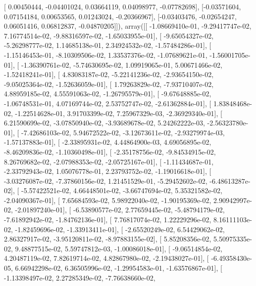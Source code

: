 \documentclass{article}
\begin{document}
       [ 0.00450444, -0.04401024,  0.03664119,  0.04098977, -0.07782698],
       [-0.03571604,  0.07154184,  0.00653565,  0.01243024, -0.20366967],
       [-0.03403476, -0.02654247,  0.06051416,  0.06812837, -0.04870205]]), array([[ -1.08669410e-01,  -9.29417747e-02,   7.16774514e-02,
         -9.88316597e-02,  -1.65033955e-01],
       [ -9.65054327e-02,  -5.26298777e-02,   1.14685138e-01,
          2.34924532e-02,  -1.57484286e-01],
       [ -1.15146453e-01,  -8.10309506e-02,   1.33537376e-02,
         -1.07689621e-01,  -1.56001705e-01],
       [ -1.36390761e-02,  -5.74630695e-02,   1.09919065e-01,
          5.00671466e-02,  -1.52418241e-01],
       [  4.83083187e-02,  -5.22141236e-02,  -2.93654150e-02,
         -9.05025364e-02,  -1.52636059e-01],
       [  1.79263829e-02,  -7.93710407e-02,   4.88959185e-02,
          4.55591063e-02,  -1.26795579e-01],
       [ -9.67648885e-02,  -1.06748531e-01,   4.07169744e-02,
          2.53752747e-02,  -2.61362884e-01],
       [  1.83848468e-02,  -1.22514628e-01,   3.91703399e-02,
          7.25967329e-03,  -2.36929340e-01],
       [  6.21590699e-02,  -3.07850940e-02,  -3.93689678e-02,
          5.24262222e-03,  -2.56323780e-01],
       [ -7.42686103e-02,   5.94672522e-02,  -3.12673611e-02,
         -2.93279974e-03,  -1.57137883e-01],
       [ -2.33895931e-02,   4.44864900e-03,   4.69056895e-02,
         -8.46209836e-02,  -1.10360498e-01],
       [ -2.35178756e-02,  -9.84534915e-02,   8.26769682e-02,
         -2.07988353e-02,  -2.05725167e-01],
       [ -1.11434687e-01,  -2.33792943e-02,   1.05076778e-01,
          2.23793752e-02,  -1.19016618e-01],
       [ -3.03276087e-02,  -7.37860156e-02,   1.21451529e-01,
         -5.29452602e-02,  -6.48613287e-02],
       [ -5.57422521e-02,   4.66448501e-02,  -3.66747694e-02,
          5.35321582e-02,  -2.04090367e-01],
       [  7.65684593e-02,   5.98922040e-02,  -1.90195369e-02,
          2.90942997e-02,  -2.01897240e-01],
       [ -6.53890577e-02,   2.77659445e-02,  -5.48794179e-02,
         -7.61892942e-02,  -1.84762136e-01],
       [  7.76817074e-02,   1.22229296e-02,   8.16111103e-02,
         -1.82459696e-02,  -1.33913411e-01],
       [ -2.65520249e-02,   6.54429062e-02,   2.86327917e-02,
         -3.95120811e-02,  -8.97883155e-02],
       [  5.85208356e-02,   5.50975335e-02,   9.48877515e-02,
          5.59747812e-03,  -1.00086018e-01],
       [ -9.06514854e-02,   4.20487119e-02,   7.82619714e-02,
          4.82867980e-02,  -2.19438027e-01],
       [ -6.49358430e-05,   6.66942298e-02,   6.36505996e-02,
         -1.29954583e-01,  -1.63576867e-01],
       [ -1.13398497e-02,   2.27285349e-02,  -7.76638660e-02,
\end{document}
